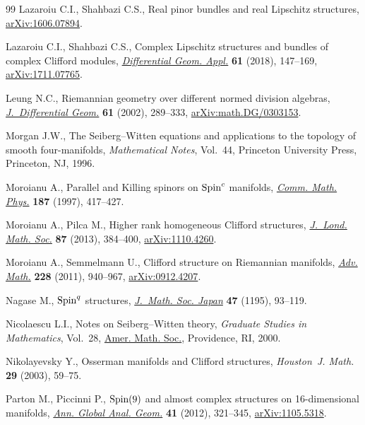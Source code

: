 \begin{thebibliography}{99}
Lazaroiu C.I., Shahbazi C.S., Real pinor bundles and real {L}ipschitz
 structures, \href{https://arxiv.org/abs/1606.07894}{arXiv:1606.07894}.

Lazaroiu C.I., Shahbazi C.S., Complex {L}ipschitz structures and bundles of
 complex {C}lifford modules, \href{https://doi.org/10.1016/j.difgeo.2018.08.006}{\textit{Differential Geom. Appl.}} \textbf{61}
 (2018), 147--169, \href{https://arxiv.org/abs/1711.07765}{arXiv:1711.07765}.

Leung N.C., Riemannian geometry over different normed division algebras,
 \href{https://doi.org/10.4310/jdg/1090351387}{\textit{J.~Differential Geom.}} \textbf{61} (2002), 289--333,
 \href{https://arxiv.org/abs/math.DG/0303153}{arXiv:math.DG/0303153}.

Morgan J.W., The {S}eiberg--{W}itten equations and applications to the topology
 of smooth four-manifolds, \textit{Mathematical Notes}, Vol.~44, Princeton
 University Press, Princeton, NJ, 1996.

Moroianu A., Parallel and {K}illing spinors on {${\rm Spin}^c$} manifolds,
 \href{https://doi.org/10.1007/s002200050142}{\textit{Comm. Math. Phys.}} \textbf{187} (1997), 417--427.

Moroianu A., Pilca M., Higher rank homogeneous {C}lifford structures,
 \href{https://doi.org/10.1112/jlms/jds061}{\textit{J.~Lond. Math. Soc.}} \textbf{87} (2013), 384--400,
 \href{https://arxiv.org/abs/1110.4260}{arXiv:1110.4260}.

Moroianu A., Semmelmann U., Clifford structure on {R}iemannian manifolds,
 \href{https://doi.org/10.1016/j.aim.2011.06.006}{\textit{Adv. Math.}} \textbf{228} (2011), 940--967, \href{https://arxiv.org/abs/0912.4207}{arXiv:0912.4207}.

Nagase M., ${\rm Spin}^q$ structures, \href{https://doi.org/10.2969/jmsj/04710093}{\textit{J.~Math. Soc. Japan}}
 \textbf{47} (1195), 93--119.

Nicolaescu L.I., Notes on {S}eiberg--{W}itten theory, \textit{Graduate Studies
 in Mathematics}, Vol.~28, \href{https://doi.org/10.1090/gsm/028}{Amer. Math. Soc.}, Providence, RI, 2000.

Nikolayevsky Y., Osserman manifolds and {C}lifford structures,
 \textit{Houston~J. Math.} \textbf{29} (2003), 59--75.

Parton M., Piccinni P., {$\rm Spin(9)$} and almost complex structures on
 16-dimensional manifolds, \href{https://doi.org/10.1007/s10455-011-9285-x}{\textit{Ann. Global Anal. Geom.}} \textbf{41}
 (2012), 321--345, \href{https://arxiv.org/abs/1105.5318}{arXiv:1105.5318}.


\end{thebibliography}
